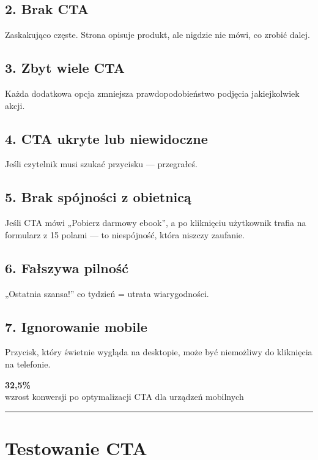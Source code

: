 \documentclass[
  12pt,
  a4paper,
  twoside,
  openright,
  12pt,
  DIV=12,
  BCOR=12mm]{scrbook}
\newcommand{\decoline}{%
  \begin{center}
    \textcolor{bordergray}{\rule{0.3\textwidth}{0.5pt}}
  \end{center}
}
\newcommand{\stathighlight}[2]{%
  \begin{center}
    \begin{tcolorbox}[
      enhanced,
      colback=primarylight,
      colframe=primaryblue,
      boxrule=1pt,
      arc=5pt,
      width=0.6\textwidth,
      halign=center
    ]
      {\fontsize{36}{40}\selectfont\bfseries\color{primarydark}#1}\\[5pt]
      {\color{textmuted}#2}
    \end{tcolorbox}
  \end{center}
}
\begin{document}
\subsection{2. Brak CTA}\label{brak-cta}

Zaskakująco częste. Strona opisuje produkt, ale nigdzie nie mówi, co
zrobić dalej.

\subsection{3. Zbyt wiele CTA}\label{zbyt-wiele-cta}

Każda dodatkowa opcja zmniejsza prawdopodobieństwo podjęcia
jakiejkolwiek akcji.

\subsection{4. CTA ukryte lub
niewidoczne}\label{cta-ukryte-lub-niewidoczne}

Jeśli czytelnik musi szukać przycisku --- przegrałeś.

\subsection{5. Brak spójności z
obietnicą}\label{brak-spuxf3jnoux15bci-z-obietnicux105}

Jeśli CTA mówi „Pobierz darmowy ebook'', a po kliknięciu użytkownik
trafia na formularz z 15 polami --- to niespójność, która niszczy
zaufanie.

\subsection{6. Fałszywa pilność}\label{faux142szywa-pilnoux15bux107}

„Ostatnia szansa!'' co tydzień = utrata wiarygodności.

\subsection{7. Ignorowanie mobile}\label{ignorowanie-mobile}

Przycisk, który świetnie wygląda na desktopie, może być niemożliwy do
kliknięcia na telefonie.

\stathighlight{32,5\%}{wzrost konwersji po optymalizacji CTA dla urządzeń mobilnych}

\decoline

\section{Testowanie CTA}\label{testowanie-cta}
\end{document}

